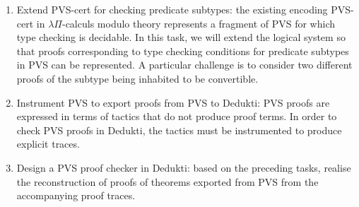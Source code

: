 \begin{enumerate}
\item Extend PVS-cert for checking predicate subtypes: the existing encoding
  PVS-cert in $\lambda\Pi$-calculs modulo theory represents a fragment of PVS
  for which type checking is decidable. In this task, we will extend the logical
  system so that proofs corresponding to type checking conditions for predicate
  subtypes in PVS can be represented. A particular challenge is to consider two
  different proofs of the subtype being inhabited to be convertible.
\item Instrument PVS to export proofs from PVS to Dedukti: PVS proofs are
  expressed in terms of tactics that do not produce proof terms. In order to
  check PVS proofs in Dedukti, the tactics must be instrumented to produce
  explicit traces.
\item Design a PVS proof checker in Dedukti: based on the preceding tasks,
  realise the reconstruction of proofs of theorems exported from PVS from the
  accompanying proof traces.
\end{enumerate}
